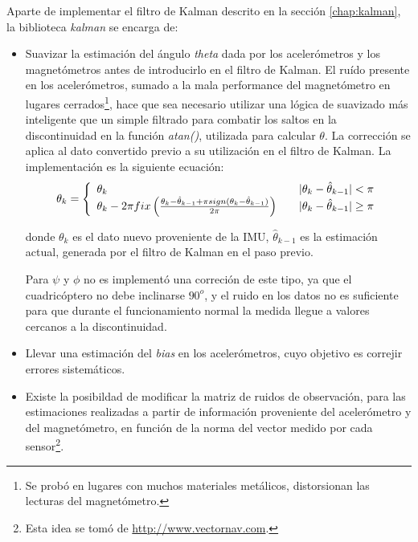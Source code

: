 \documentclass[main]{subfiles}
\begin{document}
Aparte de implementar el filtro de Kalman descrito en la secci\'on \ref{chap:kalman}, la biblioteca \textit{kalman} se encarga de:


\begin{itemize}
\item Suavizar la estimaci\'on del \'angulo \textit{theta} dada por los aceler\'ometros y los magnet\'ometros antes de introducirlo en el filtro de Kalman. El ru\'ido presente en los aceler\'ometros, sumado a la mala performance del magnet\'ometro en lugares cerrados\footnote{Se prob\'o en lugares con muchos materiales met\'alicos, distorsionan las lecturas del magnet\'ometro.}, hace que sea necesario utilizar una l\'ogica de suavizado m\'as inteligente que un simple filtrado para combatir los saltos en la discontinuidad en la funci\'on \textit{atan()}, utilizada para calcular $\theta$. La correcci\'on se aplica al dato convertido previo a su utilizaci\'on en el filtro de Kalman. La implementaci\'on es la siguiente ecuaci\'on:
  \[
  \theta_k = \left\{
  \begin{array}{l l}
    \theta_k & \quad \vert \theta_k - \hat{\theta}_{k-1} \vert < \pi \\
    \theta_k - 2\pi fix\left(\frac{\theta_k - \hat{\theta}_{k-1} + \pi sign(\theta_k - \hat{\theta}_{k-1})}{2\pi}\right) & \quad  \vert \theta_k - \hat{\theta}_{k-1} \vert \geq \pi \\
  \end{array} \right.
\]

donde $\theta_k$ es el dato nuevo proveniente de la IMU, $\hat{\theta}_{k-1}$ es la estimaci\'on actual, generada por el filtro de Kalman en el paso previo.

Para $\psi$ y $\phi$ no es implement\'o una correci\'on de este tipo, ya que el cuadric\'optero no debe inclinarse $90^o$, y el ruido en los datos no es suficiente para que durante el funcionamiento normal la medida llegue a valores cercanos a la discontinuidad.

\item Llevar una estimaci\'on del \textit{bias} en los aceler\'ometros, cuyo objetivo es correjir errores sistem\'aticos.
\item Existe la posibildad de modificar la matriz de ruidos de observaci\'on, para las estimaciones realizadas a partir de informaci\'on proveniente del aceler\'ometro y del magnet\'ometro, en funci\'on de la norma del vector medido por cada sensor\footnote{Esta idea se tom\'o de \url{http://www.vectornav.com}.}.
\end{itemize}
\end{document}
